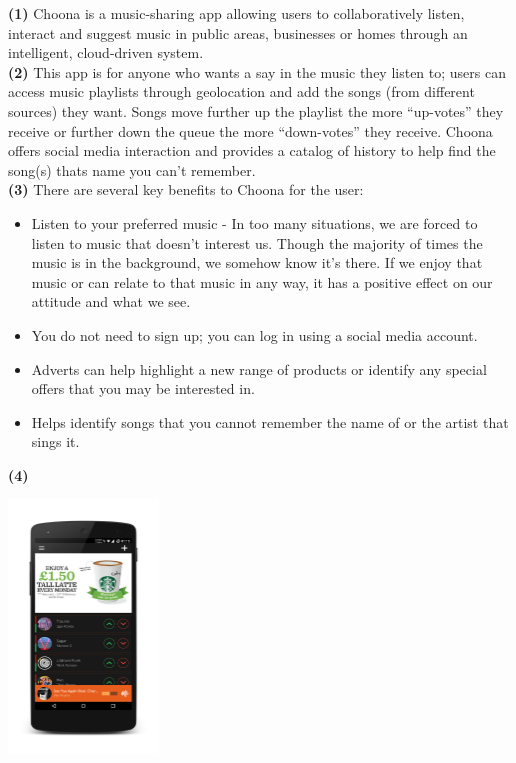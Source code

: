 \textbf{(1)} Choona is a music-sharing app allowing users to collaboratively listen, interact and suggest music in public areas, businesses or homes through an intelligent, cloud-driven system.  \\

\textbf{(2)} This app is for anyone who wants a say in the music they listen to; users can access music playlists through geolocation and add the songs (from different sources) they want.  Songs move further up the playlist the more ``up-votes'' they receive or further down the queue the more ``down-votes'' they receive.  Choona offers social media interaction and provides a catalog of history to help find the song(s) thats name you can't remember.  \\

\textbf{(3)} There are several key benefits to Choona for the user:
\begin{itemize}
\item Listen to your preferred music - In too many situations, we are forced to listen to music that doesn't interest us.  Though the majority of times the music is in the background, we somehow know it's there.  If we enjoy that music or can relate to that music in any way, it has a positive effect on our attitude and what we see.
\item You do not need to sign up; you can log in using a social media account.
\item Adverts can help highlight a new range of products or identify any special offers that you may be interested in.
\item Helps identify songs that you cannot remember the name of or the artist that sings it.
\end{itemize} 

\textbf{(4)}\\
\begin{minipage}{\linewidth}
\centering
\includegraphics[width=0.3\textwidth]{./img/idea_user_prop.png}
\label{fig:image_user_prop}
\end{minipage}\\

